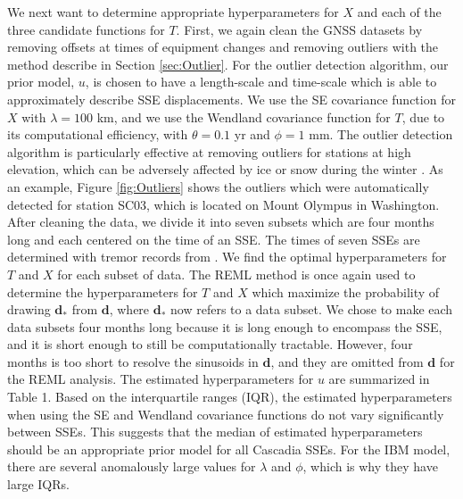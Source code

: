 \documentclass[10pt,letter]{article}
\begin{document}
We next want to determine appropriate hyperparameters for $X$ and each of the three candidate functions for $T$. First, we again clean the GNSS datasets by removing offsets at times of equipment changes and removing outliers with the method describe in Section \ref{sec:Outlier}. For the outlier detection algorithm, our prior model, $u$, is chosen to have a length-scale and time-scale which is able to approximately describe SSE displacements. We use the SE covariance function for $X$ with $\lambda = 100$ km, and we use the Wendland covariance function for $T$, due to its computational efficiency, with $\theta = 0.1$ yr and $\phi = 1$ mm. The outlier detection algorithm is particularly effective at removing outliers for stations at high elevation, which can be adversely affected by ice or snow during the winter \citep{Lisowski2008}. As an example, Figure \ref{fig:Outliers} shows the outliers which were automatically detected for station SC03, which is located on Mount Olympus in Washington.  After cleaning the data, we divide it into seven subsets which are four months long and each centered on the time of an SSE. The times of seven SSEs are determined with tremor records from \cite{Wech2010}. We find the optimal hyperparameters for $T$ and $X$ for each subset of data. The REML method is once again used to determine the hyperparameters for $T$ and $X$ which maximize the probability of drawing $\bm{d}_*$ from $\bm{d}$, where $\bm{d}_*$ now refers to a data subset. We chose to make each data subsets four months long because it is long enough to encompass the SSE, and it is short enough to still be computationally tractable. However, four months is too short to resolve the sinusoids in $\bm{d}$, and they are omitted from $\bm{d}$ for the REML analysis. The estimated hyperparameters for $u$ are summarized in Table 1. Based on the interquartile ranges (IQR), the estimated hyperparameters when using the SE and Wendland covariance functions do not vary significantly between SSEs. This suggests that the median of estimated hyperparameters should be an appropriate prior model for all Cascadia SSEs. For the IBM model, there are several anomalously large values for $\lambda$ and $\phi$, which is why they have large IQRs.   
\end{document}
